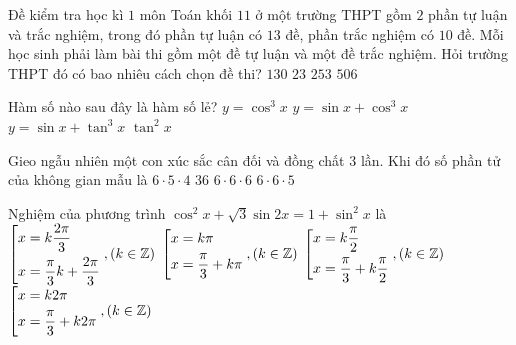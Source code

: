\begin{ex}%
	Đề kiểm tra học kì $1$ môn Toán khối $11$ ở một trường THPT gồm $2$ phần tự 
	luận và trắc nghiệm, trong đó phần tự luận có $13$ đề, phần trắc nghiệm có 
	$10$ đề. Mỗi học sinh phải làm bài thi gồm một đề tự luận và một đề trắc 
	nghiệm. Hỏi trường THPT đó có bao nhiêu cách chọn đề thi?
	\choice
	{\True $130$}
	{ $23$}
	{$253$}
	{$506$}
\end{ex}
\begin{ex}%
	Hàm số nào sau đây là hàm số lẻ?
	\choice
	{$y=\cos^3x$}
	{$y=\sin x+\cos^3x$}
	{\True $y=\sin x +\tan^3x$}
	{$\tan^2x$}
\end{ex}
\begin{ex}%
	Gieo ngẫu nhiên một con xúc sắc cân đối và đồng chất $3$ lần. Khi đó số phần tử của không gian mẫu là
	\choice
	{$6\cdot 5\cdot 4$}
	{$36$}
	{\True $6\cdot 6\cdot 6$}
	{$6\cdot 6\cdot 5$}
\end{ex}
\begin{ex}%
	Nghiệm của phương trình $\cos^2x+\sqrt{3}\sin 2x=1+\sin^2x$ là
	\choice
	{$\left[\begin{aligned}&x=k\dfrac{2\pi}{3}\\&x=\dfrac{\pi}{3}k + \dfrac{2\pi}{3}\end{aligned}\right., (k\in\mathbb{Z})$}
	{\True $\left[\begin{aligned}&x=k\pi\\&x=\dfrac{\pi}{3}+k\pi\end{aligned}\right., (k\in\mathbb{Z})$}
	{$\left[\begin{aligned}&x=k\dfrac{\pi}{2}\\&x=\dfrac{\pi}{3}+k\dfrac{\pi}{2}\end{aligned}\right., (k\in\mathbb{Z})$}
	{$\left[\begin{aligned}&x=k2\pi \\ &x=\dfrac{\pi}{3}+k2\pi\end{aligned}\right., (k\in\mathbb{Z})$}
\end{ex}
